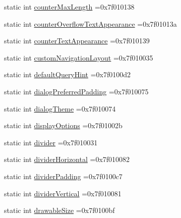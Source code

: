 \begin{DoxyCompactItemize}
\item 
static int \hyperlink{classandroid_1_1support_1_1v7_1_1recyclerview_1_1R_1_1attr_a934f94b6a4ddaae68294698ae735fddb}{counter\+Max\+Length} =0x7f010138
\item 
static int \hyperlink{classandroid_1_1support_1_1v7_1_1recyclerview_1_1R_1_1attr_aaf538a761fbe44d69c7c5ff51c8a5dc2}{counter\+Overflow\+Text\+Appearance} =0x7f01013a
\item 
static int \hyperlink{classandroid_1_1support_1_1v7_1_1recyclerview_1_1R_1_1attr_ac625fe710caa689c48fe3395dfcce88a}{counter\+Text\+Appearance} =0x7f010139
\item 
static int \hyperlink{classandroid_1_1support_1_1v7_1_1recyclerview_1_1R_1_1attr_ae79d1f3f25118e898c70ce645170394a}{custom\+Navigation\+Layout} =0x7f010035
\item 
static int \hyperlink{classandroid_1_1support_1_1v7_1_1recyclerview_1_1R_1_1attr_a699cb8d984d3bc2b3c965ecf22cb6300}{default\+Query\+Hint} =0x7f0100d2
\item 
static int \hyperlink{classandroid_1_1support_1_1v7_1_1recyclerview_1_1R_1_1attr_a12eca7ada475c5e6588bb3bb5a81d44e}{dialog\+Preferred\+Padding} =0x7f010075
\item 
static int \hyperlink{classandroid_1_1support_1_1v7_1_1recyclerview_1_1R_1_1attr_a6c09654de59e1bea982ba5c09e3ed21f}{dialog\+Theme} =0x7f010074
\item 
static int \hyperlink{classandroid_1_1support_1_1v7_1_1recyclerview_1_1R_1_1attr_ae4ed2e422c143cdd8e17b45f8894e0a6}{display\+Options} =0x7f01002b
\item 
static int \hyperlink{classandroid_1_1support_1_1v7_1_1recyclerview_1_1R_1_1attr_a74d702c9b84690c2930fa9d91aa3ef79}{divider} =0x7f010031
\item 
static int \hyperlink{classandroid_1_1support_1_1v7_1_1recyclerview_1_1R_1_1attr_aa267b9ed8fced9e055aafa434f464073}{divider\+Horizontal} =0x7f010082
\item 
static int \hyperlink{classandroid_1_1support_1_1v7_1_1recyclerview_1_1R_1_1attr_a7e3867d1f0be3701cdc6d26f7d401a04}{divider\+Padding} =0x7f0100c7
\item 
static int \hyperlink{classandroid_1_1support_1_1v7_1_1recyclerview_1_1R_1_1attr_ab6db74b41e87a1c9d5b221b5cef76a9e}{divider\+Vertical} =0x7f010081
\item 
static int \hyperlink{classandroid_1_1support_1_1v7_1_1recyclerview_1_1R_1_1attr_a74665f29b592725e1f5ab0f5b9fd64fb}{drawable\+Size} =0x7f0100bf
\item 

\end{DoxyCompactItemize}
